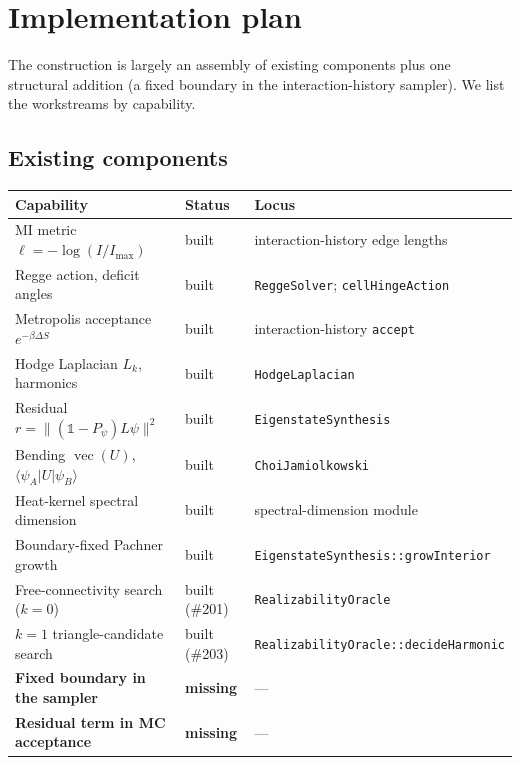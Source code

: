 \documentclass[11pt]{article}
\DeclareMathOperator{\vecop}{vec}
\newcommand{\ket}[1]{\lvert #1 \rangle}
\newcommand{\bra}[1]{\langle #1 \rvert}
\newcommand{\norm}[1]{\lVert #1 \rVert}
\theoremstyle{definition}
\theoremstyle{plain}
\begin{document}
\section{Implementation plan}
\label{sec:impl}

The construction is largely an assembly of existing components plus one structural addition
(a fixed boundary in the interaction-history sampler). We list the workstreams by capability.

\subsection{Existing components}

\begin{center}
\begin{tabular}{@{}lll@{}}
\toprule
Capability & Status & Locus \\
\midrule
MI metric $\ell=-\log(I/I_{\max})$ & built & interaction-history edge lengths \\
Regge action, deficit angles & built & \texttt{ReggeSolver}; \texttt{cellHingeAction} \\
Metropolis acceptance $e^{-\beta\Delta S}$ & built & interaction-history \texttt{accept} \\
Hodge Laplacian $L_k$, harmonics & built & \texttt{HodgeLaplacian} \\
Residual $r=\norm{(\mathbb{1}-P_\psi)L\psi}^2$ & built & \texttt{EigenstateSynthesis} \\
Bending $\vecop(U)$, $\bra{\psi_A}U\ket{\psi_B}$ & built & \texttt{ChoiJamiolkowski} \\
Heat-kernel spectral dimension & built & spectral-dimension module \\
Boundary-fixed Pachner growth & built & \texttt{EigenstateSynthesis::growInterior} \\
Free-connectivity search ($k=0$) & built (\#201) & \texttt{RealizabilityOracle} \\
$k=1$ triangle-candidate search & built (\#203) & \texttt{RealizabilityOracle::decideHarmonic} \\
\midrule
\textbf{Fixed boundary in the sampler} & \textbf{missing} & --- \\
\textbf{Residual term in MC acceptance} & \textbf{missing} & --- \\
\bottomrule
\end{tabular}
\end{center}
\end{document}
